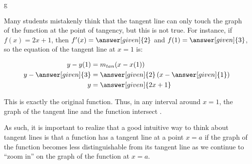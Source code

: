 g\documentclass[nooutcomes]{ximera}
\begin{document}
\begin{warning}
Many students mistakenly think that the tangent line can only touch
the graph of the function at the point of tangency, but this is not
true.  For instance, if $f(x) = 2x+1$, then $f'(x) = \answer[given]{2}$ and
$f(1) = \answer[given]{3}$, so the equation of the tangent line at
$x=1$ is:

\begin{align*}
y-y(1) &= m_{tan}(x-x(1)) \\
y - \answer[given]{3} &= \answer[given]{2}\left(x-\answer[given]{1}\right) \\
y &= \answer[given]{2x+1}
\end{align*}

This is exactly the original function.  Thus, in any interval around $x=1$, the graph of the tangent line and the function intersect .

As such, it is important to realize that a good intuitive way to think about tangent lines is that a function has a tangent line at a point $x=a$ if the graph of the function becomes less distinguishable from its tangent line as we continue to ``zoom in'' on the graph of the function at $x=a$.
\end{warning}
\end{document}
